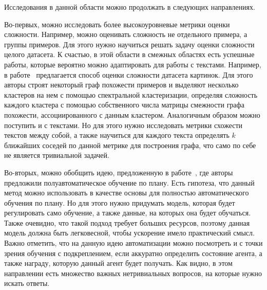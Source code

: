 \documentclass{spbau-diploma}
\begin{document}
Исследования в данной области можно продолжать в следующих направлениях.

Во-первых, можно исследовать более высокоуровневые метрики оценки сложности. Например, можно оценивать сложность не отдельного примера, а группы примеров. Для этого нужно научиться решать задачу оценки сложности целого датасета. К счастью, в этой области в смежных областях есть успешные работы, которые вероятно можно адаптировать для работы с текстами. Например, в работе~\cite{branchaud2019spectral} предлагается способ оценки сложности датасета картинок. Для этого авторы строят некоторый граф похожести примеров и выделяют несколько кластеров на нем с помощью спектральной кластеризации, определяя сложность каждого кластера с помощью собственного числа матрицы смежности графа похожести, ассоциированного с данным кластером. Аналогичным образом можно поступить и с текстами. Но для этого нужно исследовать метрики схожести текстов между собой, а также научиться для каждого текста определять $k$ ближайших соседей по данной метрике для построения графа, что само по себе не является тривиальной задачей.

Во-вторых, можно обобщить идею, предложенную в работе~\cite{xu2020curriculum}, где авторы предложили полуавтоматическое обучение по плану. Есть гипотеза, что данный метод можно использовать в качестве основы для полностью автоматического обучения по плану. Но для этого нужно придумать модель, которая будет регулировать само обучение, а также данные, на которых она будет обучаться. Также очевидно, что такой подход требует больших ресурсов, поэтому данная модель должна быть легковесной, чтобы ускорение имело практический смысл. Важно отметить, что на данную идею автоматизации можно посмотреть и с точки зрения обучения с подкреплением, если аккуратно определить состояние агента, а также награду, которую данный агент будет получать. Как видно, в этом направлении есть множество важных нетривиальных вопросов, на которые нужно искать ответы.





\end{document}
